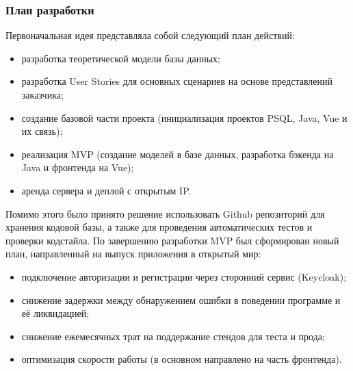     \subsubsection{План разработки}
    Первоначальная идея представляла собой следующий план действий:
    \begin{itemize}
        \item разработка теоретической модели базы данных;
        \item разработка User Stories для основных сценариев на основе представлений заказчика;
        \item создание базовой части проекта (инициализация проектов PSQL, Java, Vue и их связь);
        \item реализация MVP (создание моделей в базе данных, разработка бэкенда на Java и фронтенда на Vue);
        \item аренда сервера и деплой с открытым IP.
    \end{itemize}
    Помимо этого было принято решение использовать Github репозиторий для хранения кодовой базы, а также для проведения автоматических тестов и проверки кодстайла.
    По завершению разработки MVP был сформирован новый план, направленный на выпуск приложения в открытый мир:
    \begin{itemize}
        \item подключение авторизации и регистрации через сторонний сервис (Keycloak);
        \item снижение задержки между обнаружением ошибки в поведении программе и её ликвидацией;
        \item снижение ежемесячных трат на поддержание стендов для теста и прода;
        \item оптимизация скорости работы (в основном направлено на часть фронтенда).
    \end{itemize}

